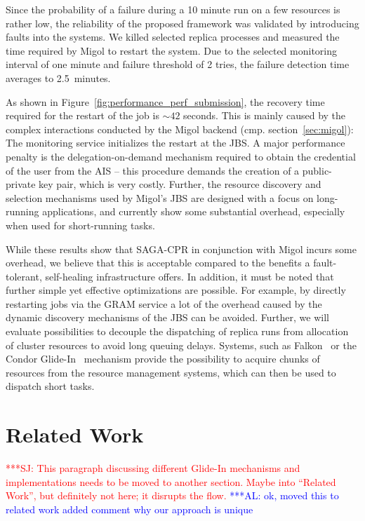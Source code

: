 \documentclass{rspublic}
\newcommand{\alnote}[1]{ {\textcolor{blue} { ***AL: #1 }}}
\newcommand{\jhanote}[1]{ {\textcolor{red} { ***SJ: #1 }}}
\newcommand{\alnote}[1]{}
\newcommand{\jhanote}[1]{}
\begin{document}
Since the probability of a failure during a 10 minute run on a few
resources is rather low, the reliability of the proposed framework was
validated by introducing faults into the systems. We killed selected
replica processes and measured the time required by Migol to restart
the system.  Due to the selected monitoring interval of one minute and
failure threshold of 2 tries, the failure detection time averages to
2.5\, minutes.

As shown in Figure~\ref{fig:performance_perf_submission}, the recovery
time required for the restart of the job is $\sim42$ seconds. This is
mainly caused by the complex interactions conducted by the Migol
backend (cmp. section~\ref{sec:migol}): The monitoring service
initializes the restart at the JBS.  A major performance penalty is
the delegation-on-demand mechanism required to obtain the credential
of the user from the AIS -- this procedure demands the creation of a
public-private key pair, which is very costly. Further, the resource
discovery and selection mechanisms used by Migol's JBS are designed
with a focus on long-running applications, and currently show some
substantial overhead, especially when used for short-running tasks.


While these results show that SAGA-CPR in conjunction with Migol
incurs some overhead, we believe that this is acceptable compared to
the benefits a fault-tolerant, self-healing infrastructure offers. In
addition, it must be noted that further simple yet effective
optimizations are possible. For example, by directly restarting jobs
via the GRAM service a lot of the overhead caused by the dynamic
discovery mechanisms of the JBS can be avoided. Further, we will
evaluate possibilities to decouple the dispatching of replica runs
from allocation of cluster resources to avoid long queuing
delays. Systems, such as Falkon~\citep{1362680} or the Condor
Glide-In~\citep{citeulike:291860} mechanism provide the possibility to
acquire chunks of resources from the resource management systems,
which can then be used to dispatch short tasks. 


\section{Related Work}

\jhanote{This paragraph discussing different Glide-In mechanisms and
  implementations needs to be moved to another section. Maybe into
  ``Related Work'', but definitely not here; it disrupts the flow.}
\alnote{ok, moved this to related work added comment why our approach is unique}
  
\end{document}
